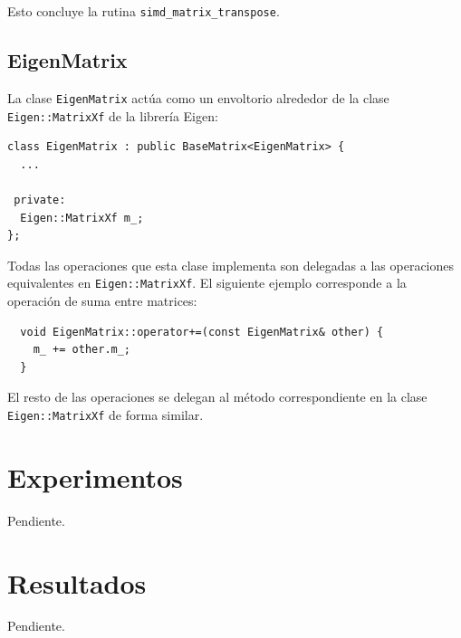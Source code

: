\documentclass[a4paper, 10pt, twoside]{article}
\newcommand{\cc}[1]{\texttt{#1}}
\begin{document}
Esto concluye la rutina \cc{simd\_matrix\_transpose}.


\subsection{EigenMatrix}

La clase \cc{EigenMatrix} actúa como un envoltorio alrededor de la clase
\cc{Eigen::MatrixXf} de la librería Eigen:

\begin{verbatim}
class EigenMatrix : public BaseMatrix<EigenMatrix> {
  ...

 private:
  Eigen::MatrixXf m_;
};
\end{verbatim}

Todas las operaciones que esta clase implementa son delegadas a las operaciones
equivalentes en \cc{Eigen::MatrixXf}. El siguiente ejemplo corresponde a la
operación de suma entre matrices:

\begin{verbatim}
  void EigenMatrix::operator+=(const EigenMatrix& other) {
    m_ += other.m_;
  }
\end{verbatim}

El resto de las operaciones se delegan al método correspondiente en la clase
\cc{Eigen::MatrixXf} de forma similar.




\section{Experimentos}

Pendiente.




\section{Resultados}

Pendiente.


\end{document}
